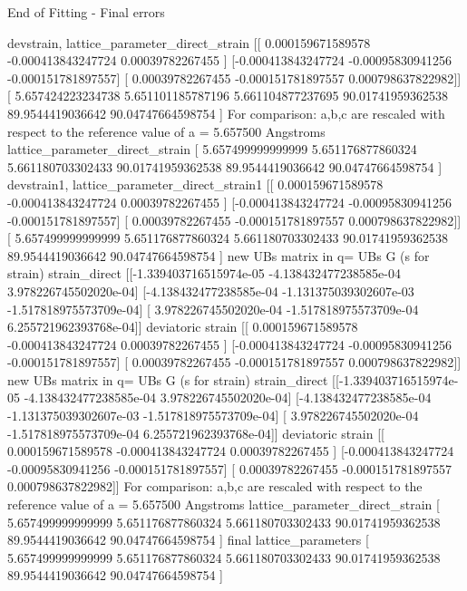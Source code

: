 \documentclass[letterpaper,10pt,english]{sphinxmanual}
\begin{document}
\begin{sphinxalltt}
 \sphinxstylestrong{**********}  End of Fitting  -  Final errors  \sphinxstylestrong{**************}


devstrain, lattice\_parameter\_direct\_strain {[}{[} 0.000159671589578 -0.000413843247724  0.00039782267455 {]}
 {[}-0.000413843247724 -0.00095830941256  -0.000151781897557{]}
 {[} 0.00039782267455  -0.000151781897557  0.000798637822982{]}{]} {[} 5.657424223234738  5.651101185787196  5.661104877237695
 90.01741959362538  89.9544419036642   90.04747664598754 {]}
For comparison: a,b,c are rescaled with respect to the reference value of a = 5.657500 Angstroms
lattice\_parameter\_direct\_strain {[} 5.657499999999999  5.651176877860324  5.661180703302433
 90.01741959362538  89.9544419036642   90.04747664598754 {]}
devstrain1, lattice\_parameter\_direct\_strain1 {[}{[} 0.000159671589578 -0.000413843247724  0.00039782267455 {]}
 {[}-0.000413843247724 -0.00095830941256  -0.000151781897557{]}
 {[} 0.00039782267455  -0.000151781897557  0.000798637822982{]}{]} {[} 5.657499999999999  5.651176877860324  5.661180703302433
 90.01741959362538  89.9544419036642   90.04747664598754 {]}
new UBs matrix in q= UBs G (s for strain)
strain\_direct {[}{[}-1.339403716515974e-05 -4.138432477238585e-04  3.978226745502020e-04{]}
 {[}-4.138432477238585e-04 -1.131375039302607e-03 -1.517818975573709e-04{]}
 {[} 3.978226745502020e-04 -1.517818975573709e-04  6.255721962393768e-04{]}{]}
deviatoric strain {[}{[} 0.000159671589578 -0.000413843247724  0.00039782267455 {]}
 {[}-0.000413843247724 -0.00095830941256  -0.000151781897557{]}
 {[} 0.00039782267455  -0.000151781897557  0.000798637822982{]}{]}
new UBs matrix in q= UBs G (s for strain)
strain\_direct {[}{[}-1.339403716515974e-05 -4.138432477238585e-04  3.978226745502020e-04{]}
 {[}-4.138432477238585e-04 -1.131375039302607e-03 -1.517818975573709e-04{]}
 {[} 3.978226745502020e-04 -1.517818975573709e-04  6.255721962393768e-04{]}{]}
deviatoric strain {[}{[} 0.000159671589578 -0.000413843247724  0.00039782267455 {]}
 {[}-0.000413843247724 -0.00095830941256  -0.000151781897557{]}
 {[} 0.00039782267455  -0.000151781897557  0.000798637822982{]}{]}
For comparison: a,b,c are rescaled with respect to the reference value of a = 5.657500 Angstroms
lattice\_parameter\_direct\_strain {[} 5.657499999999999  5.651176877860324  5.661180703302433
 90.01741959362538  89.9544419036642   90.04747664598754 {]}
final lattice\_parameters {[} 5.657499999999999  5.651176877860324  5.661180703302433
 90.01741959362538  89.9544419036642   90.04747664598754 {]}

\end{sphinxalltt}
\end{document}
